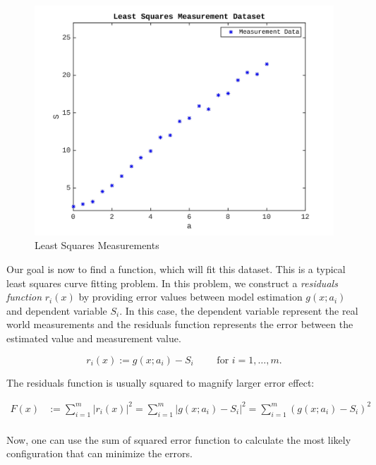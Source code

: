 \documentclass[a4paper]{report}
\numberwithin{figure}{section}
\begin{document}
\begin{figure}[H]
	\centering
	\includegraphics[width=\linewidth,natwidth=640,natheight=640]
{fig/lsq_curve_fit_measurements_v2.jpg}
	\caption{Least Squares Measurements}
	\label{fig:lsq_curve_fit_measurements}
\end{figure}


Our goal is now to find a function, which will fit this
dataset. This is a typical least squares curve fitting problem.
In this problem, we construct a \textit{residuals function} $r_i(x)$ by providing
error values between model estimation $g(x;a_i)$ and dependent
variable $S_i$. In this case, the dependent variable 
represent the real world
measurements and the residuals function represents the error between the estimated value and measurement value. 

\begin{equation}
r_i(x) := g(x;a_i) - S_i \qquad \text{ for }  i = 1,\dots,m.
\label{eq:}
\end{equation}

The residuals function is usually squared to magnify larger error effect:

\begin{equation}
\begin{aligned}
F(x) & := \sum_{i=1}^{m} \vert r_i(x) \vert^2 = 
\sum_{i=1}^{m} \vert g(x;a_i) - S_i \vert^2 =
\sum_{i=1}^{m} (g(x;a_i) - S_i)^2 \\
\label{eq}
\end{aligned}
\end{equation}

Now, one can use the sum of squared error function to calculate the most likely
configuration that can minimize the errors. 
\end{document}

